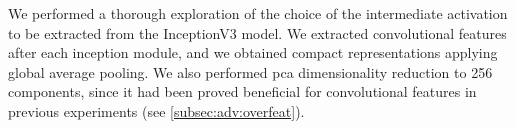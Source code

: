We performed a thorough exploration of the choice of the intermediate activation to be extracted from the InceptionV3 model.
We extracted convolutional features after each inception module, and we obtained compact representations applying global average pooling.
We also performed \gls{pca} dimensionality reduction to 256 components, since it had been proved beneficial for convolutional features in previous experiments (see \ref{subsec:adv:overfeat}).


